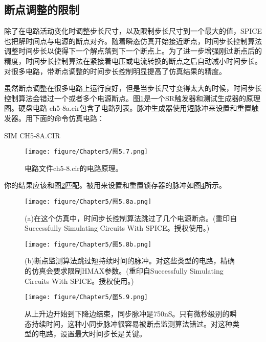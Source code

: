 \subsection{断点调整的限制}
除了在电路活动变化时调整步长尺寸，以及限制步长尺寸到一个最大的值，SPICE也把解时间点与电源的断点对齐。随着瞬态仿真开始接近断点，时间步长控制算法调整时间步长以使得下一个解点落到下一个断点上。为了进一步增强刚过断点后的精度，时间步长控制算法在紧接着电压或电流转换的断点之后自动减小时间步长。对很多电路，带断点调整的时间步长控制明显提高了仿真结果的精度。

虽然断点调整在很多电路上运行良好，但是当步长尺寸变得太大的时候，时间步长控制算法会错过一个或者多个电源断点。图\ref{图5.7}是一个SR触发器和测试生成器的原理图。硬盘电路 ch5-8a.cir包含了电路列表。脉冲生成器使用短脉冲来设置和重置触发器。用下面的命令仿真电路：

SIM CH5-8A.CIR

\begin{figure}[htbp]
\small
    \centering
    \texttt{[image: figure/Chapter5/图5.7.png]}
    \caption{电路文件ch5-8.cir的电路原理。}
    \label{图5.7}
\end{figure}

你的结果应该和图\ref{图5.8a}匹配。被用来设置和重置锁存器的脉冲如图\ref{图5.9}所示。

\begin{figure}[htbp]
\small
    \centering
    \texttt{[image: figure/Chapter5/图5.8a.png]}
    \caption{(a)在这个仿真中，时间步长控制算法跳过了几个电源断点。(重印自Successfully Simulating Circuits With SPICE。授权使用。)}
    \label{图5.8a}
\end{figure}

\begin{figure}[htbp]
\small
    \centering
    \texttt{[image: figure/Chapter5/图5.8b.png]}
    \caption{(b)断点监测算法跳过短持续时间的脉冲。对这些类型的电路，精确的仿真会要求限制HMAX参数。(重印自Successfully Simulating Circuits With SPICE。授权使用。)}
    \label{图5.8b}
\end{figure}

\begin{figure}[htbp]
\small
    \centering
    \texttt{[image: figure/Chapter5/图5.9.png]}
    \caption{从上升边开始到下降边结束，同步脉冲是750nS。只有微秒级别的瞬态持续时间，这种小同步脉冲很容易被断点监测算法错过。对这种类型的电路，设置最大时间步长是关键。}
    \label{图5.9}
\end{figure}

